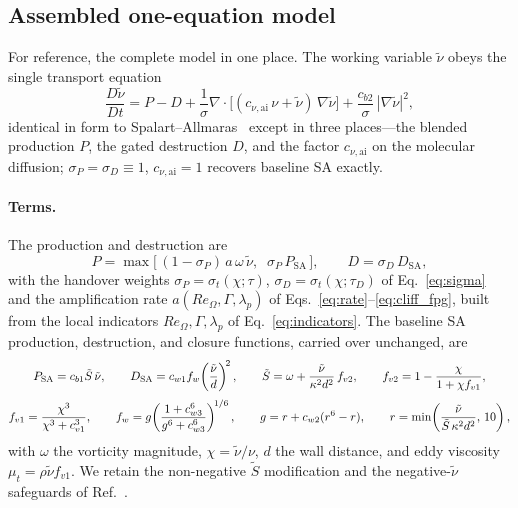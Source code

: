 \documentclass[journal]{new-aiaa}
\begin{document}
\subsection{Assembled one-equation model}\label{sec:assembled}

For reference, the complete model in one place. The working variable
$\tilde\nu$ obeys the single transport equation
\begin{equation}
  \frac{D\tilde\nu}{Dt} = P - D
  + \frac{1}{\sigma}\nabla\!\cdot\!\big[(c_{\nu,\mathrm{ai}}\,\nu+\tilde\nu)\,\nabla\tilde\nu\big]
  + \frac{c_{b2}}{\sigma}\,|\nabla\tilde\nu|^2,
  \label{eq:aisa}
\end{equation}
identical in form to Spalart--Allmaras~\cite{spalart_allmaras_1992} except in
three places---the blended production $P$, the gated destruction $D$, and the
factor $c_{\nu,\mathrm{ai}}$ on the molecular diffusion;
$\sigma_P\!=\!\sigma_D\!\equiv\!1$, $c_{\nu,\mathrm{ai}}\!=\!1$ recovers baseline SA
exactly.

\paragraph{Terms.} The production and destruction are
\begin{equation}
  P = \max\!\big[\,(1-\sigma_P)\,a\,\omega\,\tilde\nu,\;\;\sigma_P\,P_\mathrm{SA}\,\big],
  \qquad
  D = \sigma_D\,D_\mathrm{SA},
  \label{eq:aisa_pd}
\end{equation}
with the handover weights $\sigma_P\!=\!\sigma_t(\chi;\tau)$,
$\sigma_D\!=\!\sigma_t(\chi;\tau_D)$ of Eq.~\eqref{eq:sigma}
and the amplification rate $a(Re_\Omega,\Gamma,\lambda_p)$
of Eqs.~\eqref{eq:rate}--\eqref{eq:cliff_fpg}, built from the local indicators
$Re_\Omega,\Gamma,\lambda_p$ of Eq.~\eqref{eq:indicators}. The baseline SA
production, destruction, and closure functions, carried over unchanged, are
\begin{gather}
  P_\mathrm{SA} = c_{b1}\tilde S\,\tilde\nu, \qquad
  D_\mathrm{SA} = c_{w1}f_w\!\left(\frac{\tilde\nu}{d}\right)^{\!2}, \qquad
  \tilde S = \omega + \frac{\tilde\nu}{\kappa^2 d^2}\,f_{v2}, \qquad
  f_{v2} = 1 - \frac{\chi}{1+\chi f_{v1}}, \notag\\[3pt]
  f_{v1} = \frac{\chi^3}{\chi^3+c_{v1}^3}, \qquad
  f_w = g\!\left(\frac{1+c_{w3}^6}{g^6+c_{w3}^6}\right)^{\!1/6}, \qquad
  g = r + c_{w2}(r^6-r), \qquad
  r = \min\!\left(\frac{\tilde\nu}{\tilde S\,\kappa^2 d^2},\,10\right),
  \label{eq:sa_closure}
\end{gather}
with $\omega$ the vorticity magnitude, $\chi\!=\!\tilde\nu/\nu$, $d$ the wall
distance, and eddy viscosity $\mu_t\!=\!\rho\tilde\nu f_{v1}$. We retain the
non-negative $\tilde S$ modification and the negative-$\tilde\nu$ safeguards
of Ref.~\cite{allmaras_2012}.
\end{document}
